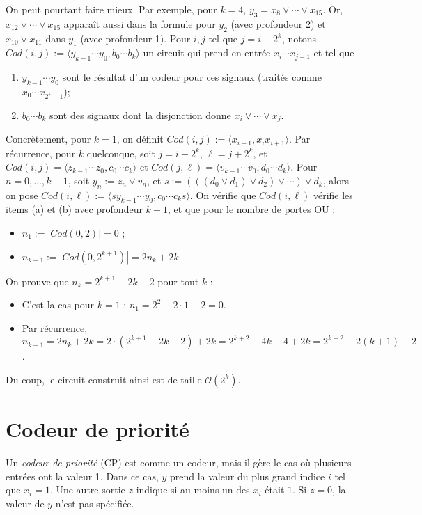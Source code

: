 \documentclass[11pt]{article}
\def\tup#1{\langle #1\rangle}
\begin{document}
\begin{enumerate}
\begin{solution}
On peut pourtant faire mieux. Par exemple, pour $k=4$, $y_3=x_8\lor\cdots\lor x_{15}$. Or, $x_{12}\lor\cdots\lor x_{15}$ apparaît aussi dans la formule pour
$y_2$ (avec profondeur 2) et $x_{10}\lor x_{11}$ dans $y_1$ (avec profondeur 1).
Pour $i,j$ tel que $j=i+2^k$, notons $Cod(i,j):=\tup{y_{k-1}\cdots y_0,
b_0\cdots b_k}$ un circuit qui prend en entrée $x_i\cdots x_{j-1}$ et tel que
\begin{enumerate}
\item $y_{k-1}\cdots y_0$ sont le résultat d'un codeur pour ces signaux
  (traités comme $x_0\cdots x_{2^k-1}$);
\item $b_0\cdots b_k$ sont des signaux dont la disjonction donne
  $x_i\lor\cdots\lor x_j$.
\end{enumerate}
Concrètement, pour $k=1$, on définit $Cod(i,j):=\tup{x_{i+1},x_ix_{i+1}}$.
Par récurrence, pour $k$ quelconque, soit $j=i+2^k$, $\ell=j+2^k$, et
$Cod(i,j)=\tup{z_{k-1}\cdots z_0,c_0\cdots c_k}$ et
$Cod(j,\ell)=\tup{v_{k-1}\cdots v_0,d_0\cdots d_k}$.
Pour $n=0,\ldots,k-1$, soit $y_n:=z_n\lor v_n$,
et $s:=(((d_0\lor d_1)\lor d_2) \lor \cdots)\lor d_k$,
alors on pose $Cod(i,\ell):=\tup{sy_{k-1}\cdots y_0,c_0\cdots c_ks}$.
On vérifie que $Cod(i,\ell)$ vérifie les items (a) et (b) avec profondeur
$k-1$, et que pour le nombre de portes OU :
\begin{itemize}
\item $n_1:=|Cod(0,2)|=0$ ;
\item $n_{k+1} := |Cod(0,2^{k+1})| = 2n_k + 2k$.
\end{itemize}
On prouve que $n_k=2^{k+1}-2k-2$ pour tout $k$ :
\begin{itemize}
\item C'est la cas pour $k=1$ : $n_1=2^2-2\cdot1-2=0$.
\item Par récurrence, $n_{k+1}=2n_k+2k=2\cdot(2^{k+1}-2k-2)+2k=
	2^{k+2} -4k-4+2k = 2^{k+2}-2(k+1)-2$.
\end{itemize}
Du coup, le circuit construit ainsi est de taille $\mathcal{O}(2^k)$.


\end{solution}

\end{enumerate}

\section{Codeur de priorité}

Un \emph{codeur de priorité} (CP) est comme un codeur, mais il gère le
cas où plusieurs entrées ont la valeur 1. Dans ce cas, $y$ prend
la valeur du plus grand indice $i$ tel que $x_i=1$. Une autre sortie $z$
indique si au moins un des $x_i$ était $1$. Si $z=0$, la valeur de $y$
n'est pas spécifiée.
\end{document}
